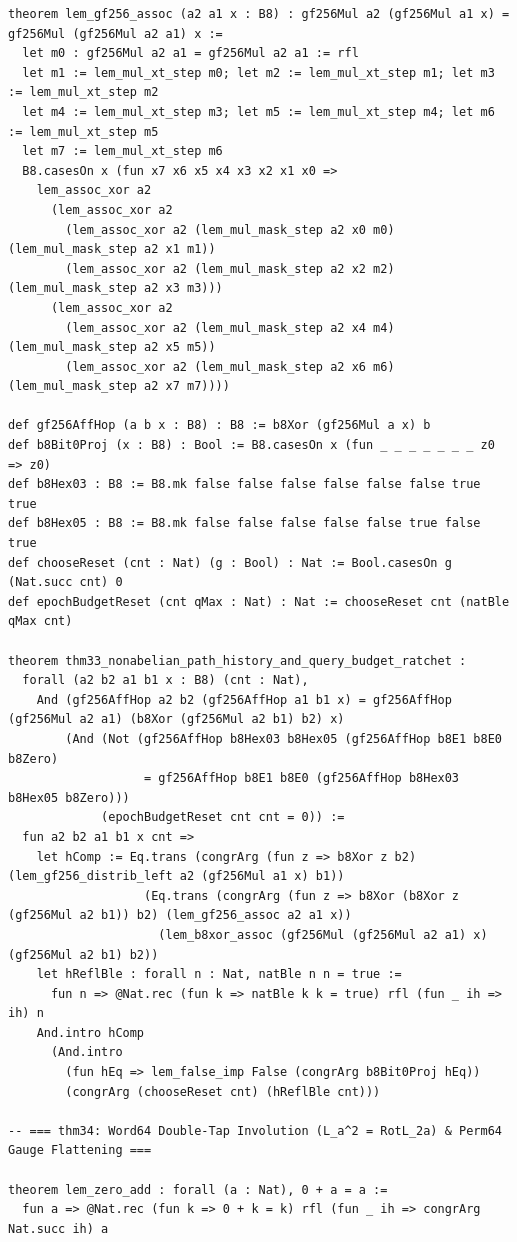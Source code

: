 \documentclass[10pt,twocolumn]{article}
\theoremstyle{spectralthm}
\begin{document}
\begin{lstlisting}[language=Lean4,caption={Standalone Pure Init.Prelude Term-Mode Lean 4 Expansion (thm30--thm37, v1.1.0, 0 sorry, 0 axioms).},label={lst:lean_v110}]
theorem lem_gf256_assoc (a2 a1 x : B8) : gf256Mul a2 (gf256Mul a1 x) = gf256Mul (gf256Mul a2 a1) x :=
  let m0 : gf256Mul a2 a1 = gf256Mul a2 a1 := rfl
  let m1 := lem_mul_xt_step m0; let m2 := lem_mul_xt_step m1; let m3 := lem_mul_xt_step m2
  let m4 := lem_mul_xt_step m3; let m5 := lem_mul_xt_step m4; let m6 := lem_mul_xt_step m5
  let m7 := lem_mul_xt_step m6
  B8.casesOn x (fun x7 x6 x5 x4 x3 x2 x1 x0 =>
    lem_assoc_xor a2
      (lem_assoc_xor a2
        (lem_assoc_xor a2 (lem_mul_mask_step a2 x0 m0) (lem_mul_mask_step a2 x1 m1))
        (lem_assoc_xor a2 (lem_mul_mask_step a2 x2 m2) (lem_mul_mask_step a2 x3 m3)))
      (lem_assoc_xor a2
        (lem_assoc_xor a2 (lem_mul_mask_step a2 x4 m4) (lem_mul_mask_step a2 x5 m5))
        (lem_assoc_xor a2 (lem_mul_mask_step a2 x6 m6) (lem_mul_mask_step a2 x7 m7))))

def gf256AffHop (a b x : B8) : B8 := b8Xor (gf256Mul a x) b
def b8Bit0Proj (x : B8) : Bool := B8.casesOn x (fun _ _ _ _ _ _ _ z0 => z0)
def b8Hex03 : B8 := B8.mk false false false false false false true true
def b8Hex05 : B8 := B8.mk false false false false false true false true
def chooseReset (cnt : Nat) (g : Bool) : Nat := Bool.casesOn g (Nat.succ cnt) 0
def epochBudgetReset (cnt qMax : Nat) : Nat := chooseReset cnt (natBle qMax cnt)

theorem thm33_nonabelian_path_history_and_query_budget_ratchet :
  forall (a2 b2 a1 b1 x : B8) (cnt : Nat),
    And (gf256AffHop a2 b2 (gf256AffHop a1 b1 x) = gf256AffHop (gf256Mul a2 a1) (b8Xor (gf256Mul a2 b1) b2) x)
        (And (Not (gf256AffHop b8Hex03 b8Hex05 (gf256AffHop b8E1 b8E0 b8Zero)
                   = gf256AffHop b8E1 b8E0 (gf256AffHop b8Hex03 b8Hex05 b8Zero)))
             (epochBudgetReset cnt cnt = 0)) :=
  fun a2 b2 a1 b1 x cnt =>
    let hComp := Eq.trans (congrArg (fun z => b8Xor z b2) (lem_gf256_distrib_left a2 (gf256Mul a1 x) b1))
                   (Eq.trans (congrArg (fun z => b8Xor (b8Xor z (gf256Mul a2 b1)) b2) (lem_gf256_assoc a2 a1 x))
                     (lem_b8xor_assoc (gf256Mul (gf256Mul a2 a1) x) (gf256Mul a2 b1) b2))
    let hReflBle : forall n : Nat, natBle n n = true :=
      fun n => @Nat.rec (fun k => natBle k k = true) rfl (fun _ ih => ih) n
    And.intro hComp
      (And.intro
        (fun hEq => lem_false_imp False (congrArg b8Bit0Proj hEq))
        (congrArg (chooseReset cnt) (hReflBle cnt)))

-- === thm34: Word64 Double-Tap Involution (L_a^2 = RotL_2a) & Perm64 Gauge Flattening ===

theorem lem_zero_add : forall (a : Nat), 0 + a = a :=
  fun a => @Nat.rec (fun k => 0 + k = k) rfl (fun _ ih => congrArg Nat.succ ih) a


\end{lstlisting}
\end{document}
